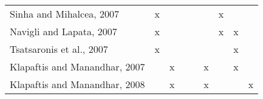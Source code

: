 \begin{table}[]
\begin{tabular}{l|cccc|cccc}
Sinha and Mihalcea, 2007 \cite{2007.Sinha.Mihalcea.Unsupervised}                 & x                                  &                                   &                                     &                                         &                                                                                  & x                                      &                                                 &                                                                                      \\
Navigli and Lapata, 2007\cite{2007.Navigli.GraphConnectivity}                    & x                                  &                                   &                                     &                                         &                                                                                  & x                                      & x                                               &                                                                                      \\
Tsatsaronis et al., 2007 \cite{2007.Tsatsaronis.WSDwithSpreading}                & x                                  &                                   &                                     &                                         &                                                                                  &                                        & x                                               &                                                                                      \\
Klapaftis and Manandhar, 2007 \cite{2007.Klapaftis.UoY}                          &                                    & x                                 &                                     &                                         & x                                                                                &                                        & x                                               &                                                                                      \\
Klapaftis and Manandhar, 2008 \cite{2008.Klapaftis.WSIUsingCollocations}         &                                    & x                                 &                                     &                                         & x                                                                                &                                        &                                                 & x                                                                                    \\

\end{tabular}
\end{table}
